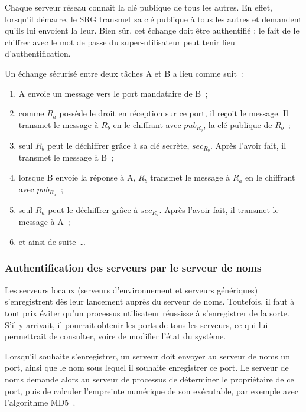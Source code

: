 Chaque serveur r\'eseau connait la cl\'e publique de tous les autres. En effet, lorsqu'il d\'emarre, le SRG transmet sa cl\'e publique \`a tous les autres et demandent qu'ils lui envoient la leur. Bien s\^ur, cet \'echange doit \^etre authentifi\'e : le fait de le chiffrer avec le mot de passe du super-utilisateur peut tenir lieu d'authentification.

Un \'echange s\'ecuris\'e entre deux t\^aches A et B a lieu comme suit~:
\begin{enumerate}
\item A envoie un message vers le port mandataire de B~;
\item comme \(R_{a}\) poss\`ede le droit en r\'eception sur ce port, il re\c{c}oit le message. Il transmet le message \`a \(R_{b}\) en le chiffrant avec \(pub_{{R}_{b}}\), la cl\'e publique de \(R_{b}\)~;
\item seul \(R_{b}\) peut le d\'echiffrer gr\^ace \`a sa cl\'e secr\`ete, \(sec_{{R}_{b}}\). Apr\`es l'avoir fait, il transmet le message \`a B~;
\item lorsque B envoie la r\'eponse \`a A, \(R_{b}\) transmet le message \`a \(R_{a}\) en le chiffrant avec \(pub_{{R}_{a}}\)~;
\item seul \(R_{a}\) peut le d\'echiffrer gr\^ace \`a \(sec_{{R}_{a}}\). Apr\`es l'avoir fait, il transmet le message \`a A~;
\item et ainsi de suite~\dots
\end{enumerate}

\subsubsection{Authentification des serveurs par le serveur de noms}

Les serveurs locaux (serveurs d'environnement et serveurs g\'en\'eriques) s'enregistrent d\`es leur lancement aupr\`es du serveur de noms. Toutefois, il faut \`a tout prix \'eviter qu'un processus utilisateur r\'eussisse \`a s'enregistrer de la sorte. S'il y arrivait, il pourrait obtenir les ports de tous les serveurs, ce qui lui permettrait de consulter, voire de modifier l'\'etat du syst\`eme.

Lorsqu'il souhaite s'enregistrer, un serveur doit envoyer au serveur de noms un port, ainsi que le nom sous lequel il souhaite enregistrer ce port. Le serveur de noms demande alors au serveur de processus de d\'eterminer le propri\'etaire de ce port, puis de calculer l'empreinte num\'erique de son ex\'ecutable, par exemple avec l'algorithme MD5~\cite{Rivest92}. 

